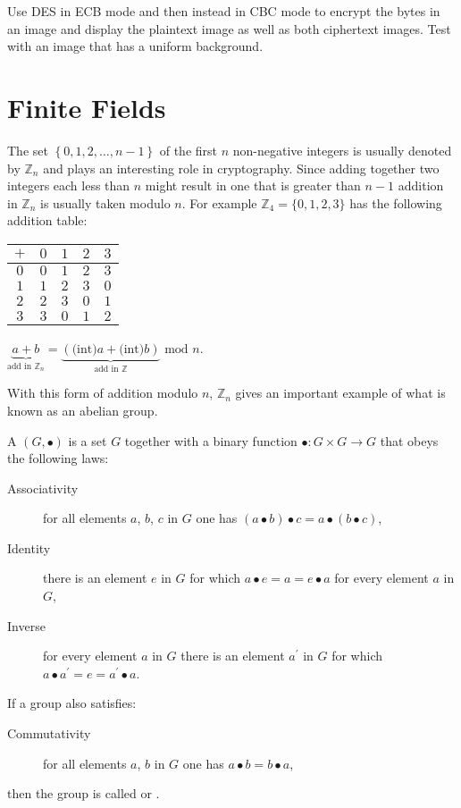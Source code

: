 \begin{exercise}
Use DES in ECB mode and then instead in CBC mode to encrypt the bytes in an image
and display the plaintext image as well as both ciphertext images.
Test with an image that has a uniform background.
\end{exercise}



\section{Finite Fields}

The set $\left\{0, 1, 2, \dots, n-1\right\}$ of the first $n$ non-negative
integers is usually denoted by $\mathbb{Z}_n$ and plays an interesting role in
cryptography. Since adding together two integers each less than $n$ might result in
one that is greater than $n-1$ addition in $\mathbb{Z}_n$ is usually taken modulo $n$.
For example $\mathbb{Z}_4 = \{0,1,2,3\}$ has the following addition table:

\begin{tabular}{|c|cccc|}\hline
  $+$ & $0$ & $1$ & $2$ & $3$ \\ \hline
  $0$ & $0$ & $1$ & $2$ & $3$ \\
  $1$ & $1$ & $2$ & $3$ & $0$ \\
  $2$ & $2$ & $3$ & $0$ & $1$ \\
  $3$ & $3$ & $0$ & $1$ & $2$ \\ \hline
\end{tabular}
\qquad\qquad
$\underbrace{a+b}_{\mbox{add in }\mathbb{Z}_n}
= \underbrace{(\mbox{(int)}a + \mbox{(int)}b)}_{\mbox{add in }\mathbb{Z}} \mbox{ mod } n$.

\noindent With this form of addition modulo $n$, $\mathbb{Z}_n$ gives an important example
of what is known as an abelian group.

A  $(G, \bullet)$ is a set $G$ together with a binary function
$\bullet\colon G\times G\rightarrow G$ that obeys the following laws:
\begin{description}
  \item[Associativity] for all elements $a$, $b$, $c$ in $G$ one has
  $(a\bullet b)\bullet c = a\bullet(b\bullet c)$,
  \item[Identity] there is an element $e$ in $G$ for which $a\bullet e=a=e\bullet a$
  for every element $a$ in $G$,
  \item[Inverse] for every element $a$ in $G$ there is an element $a^\prime$ in $G$
  for which $a\bullet a^\prime=e=a^\prime\bullet a$.
\end{description}
If a group also satisfies:
\begin{description}
  \item[Commutativity] for all elements $a$, $b$ in $G$ one has $a\bullet b=b\bullet a$,
\end{description}
then the group is called  or .

